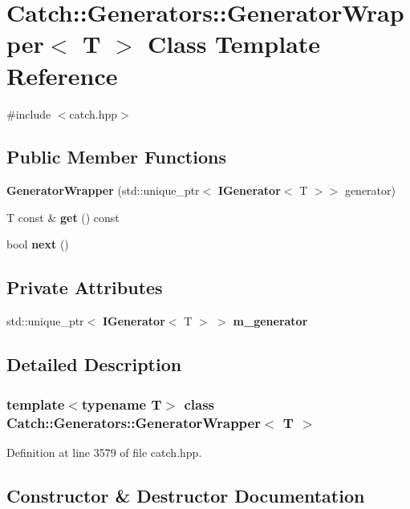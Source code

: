 \section{Catch\+::Generators\+::Generator\+Wrapper$<$ T $>$ Class Template Reference}
\label{class_catch_1_1_generators_1_1_generator_wrapper}


{\ttfamily \#include $<$catch.\+hpp$>$}

\subsection*{Public Member Functions}
\begin{DoxyCompactItemize}
\item 
\textbf{ Generator\+Wrapper} (std\+::unique\+\_\+ptr$<$ \textbf{ I\+Generator}$<$ T $>$$>$ generator)
\item 
T const  \& \textbf{ get} () const
\item 
bool \textbf{ next} ()
\end{DoxyCompactItemize}
\subsection*{Private Attributes}
\begin{DoxyCompactItemize}
\item 
std\+::unique\+\_\+ptr$<$ \textbf{ I\+Generator}$<$ T $>$ $>$ \textbf{ m\+\_\+generator}
\end{DoxyCompactItemize}


\subsection{Detailed Description}
\subsubsection*{template$<$typename T$>$\newline
class Catch\+::\+Generators\+::\+Generator\+Wrapper$<$ T $>$}



Definition at line 3579 of file catch.\+hpp.



\subsection{Constructor \& Destructor Documentation}
\mbox{\label{class_catch_1_1_generators_1_1_generator_wrapper_aecffeafd4fd38d91a52dadf28b6e2b29}} 
